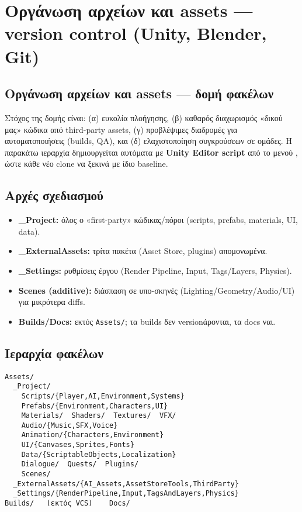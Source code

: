 \section{Οργάνωση αρχείων και assets — version control (Unity, Blender, Git)}

\subsection{Οργάνωση αρχείων και assets — δομή φακέλων}

Στόχος της δομής είναι: (α) ευκολία πλοήγησης, (β) καθαρός διαχωρισμός «δικού μας» κώδικα από third-party assets, (γ) προβλέψιμες διαδρομές για αυτοματοποιήσεις (builds, QA), και (δ) ελαχιστοποίηση συγκρούσεων σε ομάδες. Η παρακάτω ιεραρχία δημιουργείται αυτόματα με \textbf{Unity Editor script} από το μενού , ώστε κάθε νέο clone να ξεκινά με ίδιο baseline.

\subsection*{Αρχές σχεδιασμού }
\begin{itemize}
  \item \textbf{\_Project:} όλος ο «first-party» κώδικας/πόροι (scripts, prefabs, materials, UI, data).
  \item \textbf{\_ExternalAssets:} τρίτα πακέτα (Asset Store, plugins) απομονωμένα.
  \item \textbf{\_Settings:} ρυθμίσεις έργου (Render Pipeline, Input, Tags/Layers, Physics).
  \item \textbf{Scenes (additive):} διάσπαση σε υπο-σκηνές (Lighting/Geometry/Audio/UI) για μικρότερα diffs.
  \item \textbf{Builds/Docs:} εκτός \texttt{Assets/}; τα builds δεν versionάρονται, τα docs ναι.
\end{itemize}

\subsection*{Ιεραρχία φακέλων }
\begin{verbatim}
Assets/
  _Project/
    Scripts/{Player,AI,Environment,Systems}
    Prefabs/{Environment,Characters,UI}
    Materials/  Shaders/  Textures/  VFX/
    Audio/{Music,SFX,Voice}
    Animation/{Characters,Environment}
    UI/{Canvases,Sprites,Fonts}
    Data/{ScriptableObjects,Localization}
    Dialogue/  Quests/  Plugins/
    Scenes/
  _ExternalAssets/{AI_Assets,AssetStoreTools,ThirdParty}
  _Settings/{RenderPipeline,Input,TagsAndLayers,Physics}
Builds/   (εκτός VCS)    Docs/
\end{verbatim}

